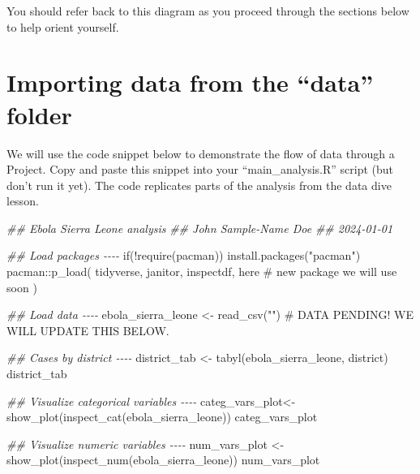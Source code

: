 \documentclass[
  letterpaper,
  DIV=11,
  numbers=noendperiod]{scrreprt}
\newenvironment{Shaded}{\begin{snugshade}}{\end{snugshade}}
\newcommand{\CommentTok}[1]{\textcolor[rgb]{0.37,0.37,0.37}{#1}}
\newcommand{\ControlFlowTok}[1]{\textcolor[rgb]{0.00,0.23,0.31}{#1}}
\newcommand{\DocumentationTok}[1]{\textcolor[rgb]{0.37,0.37,0.37}{\textit{#1}}}
\newcommand{\FunctionTok}[1]{\textcolor[rgb]{0.28,0.35,0.67}{#1}}
\newcommand{\NormalTok}[1]{\textcolor[rgb]{0.00,0.23,0.31}{#1}}
\newcommand{\OtherTok}[1]{\textcolor[rgb]{0.00,0.23,0.31}{#1}}
\newcommand{\SpecialCharTok}[1]{\textcolor[rgb]{0.37,0.37,0.37}{#1}}
\newcommand{\StringTok}[1]{\textcolor[rgb]{0.13,0.47,0.30}{#1}}
\begin{document}
You should refer back to this diagram as you proceed through the
sections below to help orient yourself.

\hypertarget{importing-data-from-the-data-folder}{%
\section{Importing data from the ``data''
folder}\label{importing-data-from-the-data-folder}}

We will use the code snippet below to demonstrate the flow of data
through a Project. Copy and paste this snippet into your
``main\_analysis.R'' script (but don't run it yet). The code replicates
parts of the analysis from the data dive lesson.

\begin{Shaded}
\begin{Highlighting}[]
\DocumentationTok{\#\# Ebola Sierra Leone analysis}
\DocumentationTok{\#\# John Sample{-}Name Doe}
\DocumentationTok{\#\# 2024{-}01{-}01}


\DocumentationTok{\#\# Load packages {-}{-}{-}{-}}
\ControlFlowTok{if}\NormalTok{(}\SpecialCharTok{!}\FunctionTok{require}\NormalTok{(pacman)) }\FunctionTok{install.packages}\NormalTok{(}\StringTok{"pacman"}\NormalTok{)}
\NormalTok{pacman}\SpecialCharTok{::}\FunctionTok{p\_load}\NormalTok{(}
\NormalTok{  tidyverse,}
\NormalTok{  janitor,}
\NormalTok{  inspectdf,}
\NormalTok{  here }\CommentTok{\# new package we will use soon}
\NormalTok{)}


\DocumentationTok{\#\# Load data {-}{-}{-}{-}}
\NormalTok{ebola\_sierra\_leone }\OtherTok{\textless{}{-}} \FunctionTok{read\_csv}\NormalTok{(}\StringTok{""}\NormalTok{) }\CommentTok{\# DATA PENDING! WE WILL UPDATE THIS BELOW.}

\DocumentationTok{\#\# Cases by district {-}{-}{-}{-}}
\NormalTok{district\_tab }\OtherTok{\textless{}{-}} \FunctionTok{tabyl}\NormalTok{(ebola\_sierra\_leone, district)}
\NormalTok{district\_tab}

\DocumentationTok{\#\# Visualize categorical variables {-}{-}{-}{-}}
\NormalTok{categ\_vars\_plot}\OtherTok{\textless{}{-}} \FunctionTok{show\_plot}\NormalTok{(}\FunctionTok{inspect\_cat}\NormalTok{(ebola\_sierra\_leone))}
\NormalTok{categ\_vars\_plot}

\DocumentationTok{\#\# Visualize numeric variables {-}{-}{-}{-}}
\NormalTok{num\_vars\_plot }\OtherTok{\textless{}{-}} \FunctionTok{show\_plot}\NormalTok{(}\FunctionTok{inspect\_num}\NormalTok{(ebola\_sierra\_leone))}
\NormalTok{num\_vars\_plot}
\end{Highlighting}
\end{Shaded}
\end{document}

